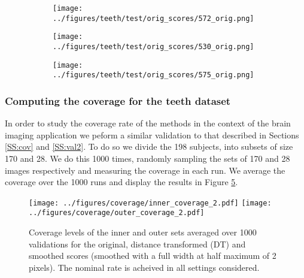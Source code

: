 \begin{figure}[h!]
	\begin{subfigure}{0.16\textwidth}
		\centering
		\texttt{[image: ../figures/teeth/test/orig\_scores/572\_orig.png]}
		\label{fig:1}
	\end{subfigure}
	\begin{subfigure}{0.16\textwidth}
		\centering
		\texttt{[image: ../figures/teeth/test/orig\_scores/530\_orig.png]}
		\label{fig:1}
	\end{subfigure}
	\begin{subfigure}{0.16\textwidth}
		\centering
		\texttt{[image: ../figures/teeth/test/orig\_scores/575\_orig.png]}
		\label{fig:1}
	\end{subfigure}
	\caption{}\label{fig:teethorig}
\end{figure}

\subsubsection{Computing the coverage for the teeth dataset}\label{val3}
In order to study the coverage rate of the methods in the context of the brain imaging application we peform a similar validation to that described in Sections \ref{SS:cov} and \ref{SS:val2}. To do so we divide the 198 subjects, into subsets of size 170 and 28. We do this 1000 times, randomly sampling the sets of 170 and 28 images respectively and measuring the coverage in each run. We average the coverage over the 1000 runs and display the results in Figure \ref{fig:coverage3}.
\begin{figure}[h!]
	\begin{center}
		\texttt{[image: ../figures/coverage/inner\_coverage\_2.pdf]}
		\texttt{[image: ../figures/coverage/outer\_coverage\_2.pdf]}
	\end{center}
	\caption{Coverage levels of the inner and outer sets averaged over 1000 validations for the original, distance transformed (DT) and smoothed scores (smoothed with a full width at half maximum of 2 pixels). The nominal rate is acheived in all settings considered.}\label{fig:coverage3}
\end{figure}

